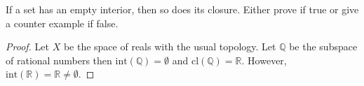 \setcounter{question}{10}  %
\begin{question}[Fernandez]
  If a set has an empty interior, then so does its closure. Either prove if true or give a counter example if false. 
\end{question}
    
\begin{proof}
  Let $X$ be the space of reals with the usual topology. Let $\mathbb{Q}$ be the subspace of rational numbers then $\mbox{int}(\mathbb{Q})=\emptyset$ and $\mbox{cl}(\mathbb{Q})=\mathbb{R}$. However, $\mbox{int}(\mathbb{R})=\mathbb{R}\neq\emptyset$.
\end{proof}

